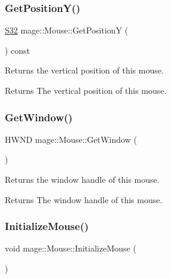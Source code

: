 \subsubsection{\texorpdfstring{Get\+Position\+Y()}{GetPositionY()}}
{\footnotesize\ttfamily \hyperlink{namespacemage_a642e05c5c83642b6946703615cdbf2da}{S32} mage\+::\+Mouse\+::\+Get\+PositionY (\begin{DoxyParamCaption}{ }\end{DoxyParamCaption}) const\hspace{0.3cm}{\ttfamily [noexcept]}}

Returns the vertical position of this mouse.

\begin{DoxyReturn}{Returns}
The vertical position of this mouse. 
\end{DoxyReturn}
\hypertarget{classmage_1_1_mouse_a8d6b15af2bb60cc38334255ad2fbe576}{}\label{classmage_1_1_mouse_a8d6b15af2bb60cc38334255ad2fbe576} 
\subsubsection{\texorpdfstring{Get\+Window()}{GetWindow()}}
{\footnotesize\ttfamily H\+W\+ND mage\+::\+Mouse\+::\+Get\+Window (\begin{DoxyParamCaption}{ }\end{DoxyParamCaption})\hspace{0.3cm}{\ttfamily [noexcept]}}

Returns the window handle of this mouse.

\begin{DoxyReturn}{Returns}
The window handle of this mouse. 
\end{DoxyReturn}
\hypertarget{classmage_1_1_mouse_ac158b6d6fff5b05dea5ebefa86c0d56a}{}\label{classmage_1_1_mouse_ac158b6d6fff5b05dea5ebefa86c0d56a} 
\subsubsection{\texorpdfstring{Initialize\+Mouse()}{InitializeMouse()}}
{\footnotesize\ttfamily void mage\+::\+Mouse\+::\+Initialize\+Mouse (\begin{DoxyParamCaption}{ }\end{DoxyParamCaption})\hspace{0.3cm}{\ttfamily [private]}}

